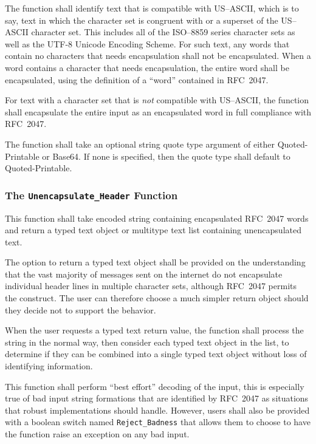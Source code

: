 \documentclass[11pt]{article}
\begin{document}
The function shall identify text that is compatible with US--ASCII,
which is to say, text in which the character set is congruent with or
a superset of the US--ASCII character set. This includes all of the
ISO--8859 series character sets as well as the UTF-8 Unicode Encoding
Scheme. For such text, any words that contain no characters
that needs encapsulation shall not be encapsulated. When a word
contains a character that needs encapsulation, the entire word shall
be encapsulated, using the definition of a ``word'' contained in
RFC~2047.

For text with a character set that is \emph{not} compatible with
US--ASCII, the function shall encapsulate the entire input as an
encapsulated word in full compliance with RFC~2047.

The function shall take an optional string quote type argument of
either Quoted-Print\-able or Base64. If none is specified, then the
quote type shall default to Quoted-Printable.

\subsubsection{The \texttt{Unencapsulate\_Header} Function}

This function shall take encoded string containing encapsulated
RFC~2047 words and return a typed text object or multitype text list
containing unencapsulated text.

The option to return a typed text object shall be provided on the
understanding that the vast majority of messages sent on the internet
do not encapsulate individual header lines in multiple character sets,
although RFC~2047 permits the construct. The user can therefore choose
a much simpler return object should they decide not to support the
behavior.

When the user requests a typed text return value, the function shall
process the string in the normal way, then consider each typed text
object in the list, to determine if they can be combined into a
single typed text object without loss of identifying information. 

This function shall perform ``best effort'' decoding of the input,
this is especially true of bad input string formations that are
identified by RFC~2047 as situations that robust implementations
should handle. However, users shall also be provided with a boolean
switch named \texttt{Reject\_Badness} that allows them to choose to
have the function raise an exception on any bad input.
\end{document}
